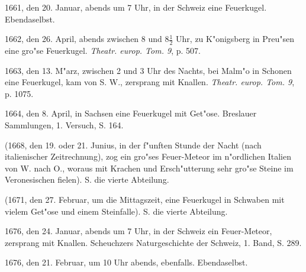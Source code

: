 \documentclass[a4paper, 11pt, oneside, polutonikogreek, german]{article}
\begin{document}
1661, den 20. Januar, abends um 7 Uhr, in der Schweiz eine Feuerkugel. Ebendaselbst.

1662, den 26. April, abends zwischen 8 und $\mathfrak{8\frac{1}{2}}$ Uhr, zu K"onigsberg in Preu"sen eine gro"se Feuerkugel. \emph{Theatr. europ. Tom. 9}, p. 507.

1663, den 13. M"arz, zwischen 2 und 3 Uhr des Nachts, bei Malm"o in Schonen eine Feuerkugel, kam von S. W., zersprang mit Knallen. \emph{Theatr. europ. Tom. 9}, p. 1075.

1664, den 8. April, in Sachsen eine Feuerkugel mit Get"ose. Breslauer Sammlungen, 1. Versuch, S. 164.

(1668, den 19. oder 21. Junius, in der f"unften Stunde der Nacht (nach italienischer Zeitrechnung), zog ein gro"ses Feuer-Meteor im n"ordlichen Italien von W. nach O., woraus mit Krachen und Ersch"utterung sehr gro"se Steine im Veronesischen fielen). S. die vierte Abteilung.

(1671, den 27. Februar, um die Mittagszeit, eine Feuerkugel in Schwaben mit vielem Get"ose und einem Steinfalle). S. die vierte Abteilung.

1676, den 24. Januar, abends um 7 Uhr, in der Schweiz ein Feuer-Meteor, zersprang mit Knallen. Scheuchzers Naturgeschichte der Schweiz, 1. Band, S. 289.

1676, den 21. Februar, um 10 Uhr abends, ebenfalls. Ebendaselbst.
\end{document}
